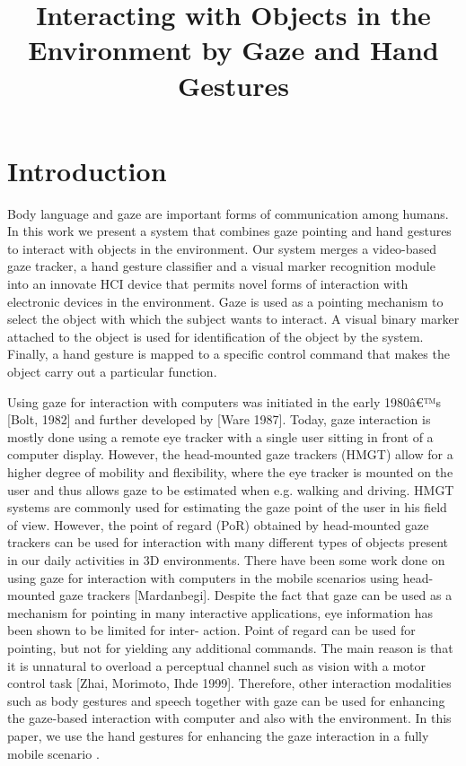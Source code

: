\documentclass[jou,a4paper,notxfonts]{apa}
\title{Interacting with Objects in the Environment by Gaze and Hand Gestures}
\begin{document}
\maketitle

\thispagestyle{plain}

\section{Introduction} 
Body language and gaze are important forms of communication among humans. In this work we present a system that combines gaze pointing and hand gestures to interact with objects in the environment. Our system merges a video-based gaze tracker, a hand gesture classifier and a visual marker recognition module into an innovate HCI device that permits novel forms of interaction with electronic devices in the environment. Gaze is used as a pointing mechanism to select the object with which the subject wants to interact. A visual binary marker attached to the object is used for identification of the object by the system. Finally, a hand gesture is mapped to a specific control command that makes the object carry out a particular function.

Using gaze for interaction with computers was initiated in the early 1980â€™s [Bolt, 1982] and further developed by [Ware 1987]. Today, gaze interaction is mostly done using a remote eye tracker with a single user sitting in front of a computer display. However, the head-mounted gaze trackers (HMGT) allow for a higher degree of mobility and flexibility, where the eye tracker is mounted on the user and thus allows gaze to be estimated when e.g. walking and driving. HMGT systems are commonly used for estimating the gaze point of the user in his field of view. However, the point of regard (PoR) obtained by head-mounted gaze trackers can be used for interaction with many different types of objects present in our daily activities in 3D environments. There have been some work done on using gaze for interaction with computers in the mobile scenarios using head-mounted gaze trackers [Mardanbegi]. Despite the fact that gaze can be used as a mechanism for pointing in many interactive applications, eye information has been shown to be limited for inter- action. Point of regard can be used for pointing, but not for yielding any additional commands. The main reason is that it is unnatural to overload a perceptual channel such as vision with a motor control task [Zhai, Morimoto, Ihde 1999]. Therefore, other interaction modalities such as body gestures and speech together with gaze can be used for enhancing the gaze-based interaction with computer and also with the environment. 
 In this paper, we use the hand gestures for enhancing the gaze interaction in a fully mobile scenario . 
 
\end{document}
